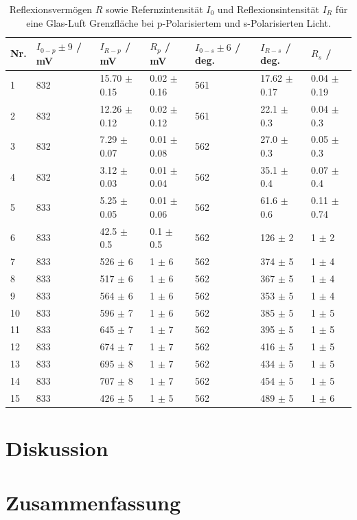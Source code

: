 \documentclass[12pt,a4paper,twoside]{article}
\begin{document}
\begin{table}[H]
    \centering
    \caption{Reflexionsvermögen $R$ sowie Refernzintensität $I_0$ und Reflexionsintensität $I_R$ für eine Glas-Luft Grenzfläche bei p-Polarisiertem und s-Polarisierten Licht.}
    \label{tab:reflexionsvermögen glas luft}
    \begin{tabular}{| l | l | l | l | l | l | l |}
        \hline
        Nr. & $I_{0-p} \pm 9$ / mV & $I_{R-p}$ / mV & $R_p$ / mV & $I_{0-s} \pm 6$ / deg. & $I_{R-s}$ / deg. & $R_s$ / \\
        \hline
        1  & 832  & 15.70 $\pm$ 0.15    & 0.02    $\pm$ 0.16 & 561 & 17.62   $\pm$ 0.17  & 0.04 $\pm$ 0.19 \\
        2  & 832  & 12.26 $\pm$ 0.12    & 0.02    $\pm$ 0.12 & 561 & 22.1    $\pm$ 0.3   & 0.04 $\pm$ 0.3 \\
        3  & 832  & 7.29  $\pm$ 0.07    & 0.01    $\pm$ 0.08 & 562 & 27.0    $\pm$ 0.3   & 0.05 $\pm$ 0.3 \\
        4  & 832  & 3.12  $\pm$ 0.03    & 0.01    $\pm$ 0.04 & 562 & 35.1    $\pm$ 0.4   & 0.07 $\pm$ 0.4 \\
        5  & 833  & 5.25  $\pm$ 0.05    & 0.01    $\pm$ 0.06 & 562 & 61.6    $\pm$ 0.6   & 0.11 $\pm$ 0.74 \\
        6  & 833  & 42.5  $\pm$ 0.5     & 0.1     $\pm$ 0.5  & 562 & 126     $\pm$ 2     & 1    $\pm$ 2 \\
        7  & 833  & 526   $\pm$ 6       & 1       $\pm$ 6    & 562 & 374     $\pm$ 5     & 1    $\pm$ 4 \\
        8  & 833  & 517   $\pm$ 6       & 1       $\pm$ 6    & 562 & 367     $\pm$ 5     & 1    $\pm$ 4 \\
        9  & 833  & 564   $\pm$ 6       & 1       $\pm$ 6    & 562 & 353     $\pm$ 5     & 1    $\pm$ 4 \\
        10 & 833  & 596   $\pm$ 7       & 1       $\pm$ 6    & 562 & 385     $\pm$ 5     & 1    $\pm$ 5 \\
        11 & 833  & 645   $\pm$ 7       & 1       $\pm$ 7    & 562 & 395     $\pm$ 5     & 1    $\pm$ 5 \\
        12 & 833  & 674   $\pm$ 7       & 1       $\pm$ 7    & 562 & 416     $\pm$ 5     & 1    $\pm$ 5 \\
        13 & 833  & 695   $\pm$ 8       & 1       $\pm$ 7    & 562 & 434     $\pm$ 5     & 1    $\pm$ 5 \\
        14 & 833  & 707   $\pm$ 8       & 1       $\pm$ 7    & 562 & 454     $\pm$ 5     & 1    $\pm$ 5 \\
        15 & 833  & 426   $\pm$ 5       & 1       $\pm$ 5    & 562 & 489     $\pm$ 5     & 1    $\pm$ 6 \\
        \hline
    \end{tabular}
\end{table}

\section{Diskussion} %


\section{Zusammenfassung} %


\printbibliography[heading=bibintoc]
\end{document}
